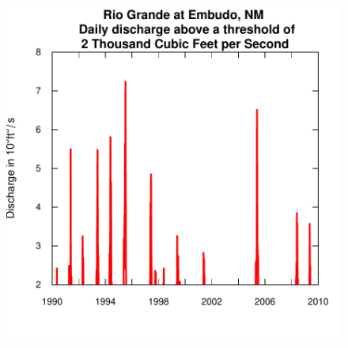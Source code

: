 \documentclass[a4paper,11pt]{article}
\begin{document}
\begin{figure}[htbp]
  \begin{minipage}[h]{0.5\linewidth}
    \begin{center}

\includegraphics{EGRET-figplotQTimeDaily}
    \label{fig:plotQTimeDaily}
    \end{center}
  \end{minipage}
  \caption{}
  \label{fig:plotQTimeDailyAND}
\end{figure}
\end{document}

